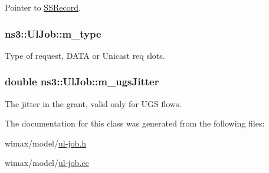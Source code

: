 Pointer to \hyperlink{classns3_1_1SSRecord}{S\+S\+Record}. 

\subsubsection[{\texorpdfstring{m\+\_\+type}{m_type}}]{ ns3\+::\+Ul\+Job\+::m\+\_\+type\hspace{0.3cm}{\ttfamily [private]}}\hypertarget{classns3_1_1UlJob_a57dafb3d0c72e0ef12e42e1e4fe5cb34}{}\label{classns3_1_1UlJob_a57dafb3d0c72e0ef12e42e1e4fe5cb34}


Type of request, D\+A\+TA or Unicast req slots. 

\subsubsection[{\texorpdfstring{m\+\_\+ugs\+Jitter}{m_ugsJitter}}]{\setlength{\rightskip}{0pt plus 5cm}double ns3\+::\+Ul\+Job\+::m\+\_\+ugs\+Jitter\hspace{0.3cm}{\ttfamily [private]}}\hypertarget{classns3_1_1UlJob_ad4f85db4984071728ecd3f2f4f4ac228}{}\label{classns3_1_1UlJob_ad4f85db4984071728ecd3f2f4f4ac228}


The jitter in the grant, valid only for U\+GS flows. 



The documentation for this class was generated from the following files\+:\begin{DoxyCompactItemize}
\item 
wimax/model/\hyperlink{ul-job_8h}{ul-\/job.\+h}\item 
wimax/model/\hyperlink{ul-job_8cc}{ul-\/job.\+cc}\end{DoxyCompactItemize}
